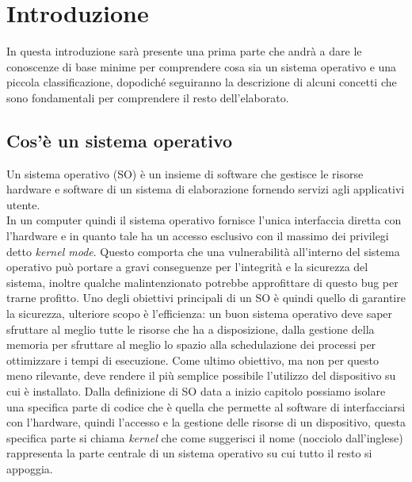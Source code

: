 \chapter{Introduzione}
In questa introduzione sarà presente una prima parte che andrà a dare le conoscenze di base minime per comprendere cosa sia un sistema operativo e una piccola classificazione, dopodiché seguiranno la descrizione di alcuni concetti che sono fondamentali per comprendere il resto dell'elaborato.

\section{Cos'è un sistema operativo}
Un sistema operativo (SO) è un insieme di software che gestisce le risorse hardware e software di un sistema di elaborazione fornendo servizi agli applicativi utente.\\
In un computer quindi il sistema operativo fornisce l'unica interfaccia diretta con l'hardware e in quanto tale ha un accesso esclusivo con il massimo dei privilegi detto \textit{kernel mode}. Questo comporta che una vulnerabilità all'interno del sistema operativo può portare a gravi conseguenze per l'integrità e la sicurezza del sistema, inoltre qualche malintenzionato potrebbe approfittare di questo bug per trarne profitto.
Uno degli obiettivi principali di un SO è quindi quello di garantire la sicurezza, ulteriore scopo è l'efficienza: un buon sistema operativo deve saper sfruttare al meglio tutte le risorse che ha a disposizione, dalla gestione della memoria per sfruttare al meglio lo spazio alla schedulazione dei processi per ottimizzare i tempi di esecuzione. Come ultimo obiettivo, ma non per questo meno rilevante, deve rendere il più semplice possibile l'utilizzo del dispositivo su cui è installato.
Dalla definizione di SO data a inizio capitolo possiamo isolare una specifica parte di codice che è quella che permette al software di interfacciarsi con l'hardware, quindi l'accesso e la gestione delle risorse di un dispositivo, questa specifica parte si chiama \textit{kernel} che come suggerisci il nome (nocciolo dall'inglese) rappresenta la parte centrale di un sistema operativo su cui tutto il resto si appoggia.\\
\newpage

